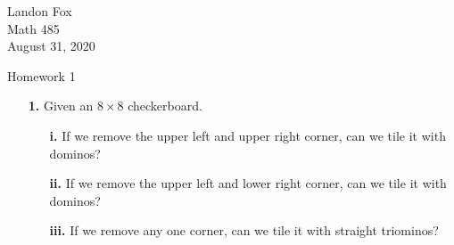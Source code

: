 \documentclass[ 12pt ]{article}
\begin{document}
\noindent Landon Fox \\
\noindent Math 485 \\
\noindent August 31, 2020

\begin{center}
\Large Homework 1
\end{center}

\begin{enumerate}
	\item[\textbf{1.}] Given an $8 \times 8$ checkerboard.
		\begin{enumerate}
			\item[\textbf{i.}] If we remove the upper left and upper right corner, can we tile it with dominos?
			\item[\textbf{ii.}] If we remove the upper left and lower right corner, can we tile it with dominos?
			\item[\textbf{iii.}] If we remove any one corner, can we tile it with straight triominos?
		\end{enumerate}


\end{enumerate}
\end{document}
